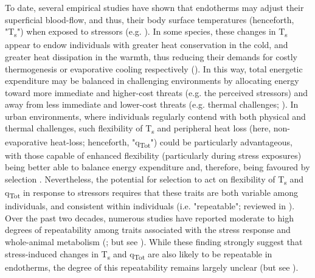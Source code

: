 \documentclass[12pt]{article}
\begin{document}
\noindent To date, several empirical studies have shown that endotherms may adjust their superficial blood-flow, and thus, their body surface temperatures (henceforth, "T\textsubscript{s}") when exposed to stressors (e.g. \citealt{blair_1959,yokoi_1966,nord_2019b,winder_2020}). In some species, these changes in T\textsubscript{s} appear to endow individuals with greater heat conservation in the cold, and greater heat dissipation in the warmth, thus reducing their demands for costly thermogenesis or evaporative cooling respectively (\citealt{jerem_2018,robertson_2020a,winder_2020}). In this way, total energetic expenditure may be balanced in challenging environments by allocating energy toward more immediate and higher-cost threats (e.g. the perceived stressors) and away from less immediate and lower-cost threats (e.g. thermal challenges; \citealt{jerem_2018,robertson_2020a}). In urban environments, where individuals regularly contend with both physical and thermal challenges, such flexibility of T\textsubscript{s} and peripheral heat loss (here, non-evaporative heat-loss; henceforth, "q\textsubscript{Tot}") could be particularly advantageous, with those capable of enhanced flexibility (particularly during stress exposures) being better able to balance energy expenditure and, therefore, being favoured by selection \citep{parsons_2005}. Nevertheless, the potential for selection to act on flexibility of T\textsubscript{s} and q\textsubscript{Tot} in response to stressors requires that these traits are both variable among individuals, and consistent within individuals (i.e. "repeatable"; reviewed in \citealt{boake_1989,wolak_2012}). Over the past two decades, numerous studies have reported moderate to high degrees of repeatability among traits associated with the stress response and whole-animal metabolism (\citealt{nespolo_2007,rensel_2011,muller_2018,boratynski_2019}; but see \citealt{ouyang_2011}). While these finding strongly suggest that stress-induced changes in T\textsubscript{s} and q\textsubscript{Tot} are also likely to be repeatable in endotherms, the degree of this repeatability remains largely unclear (but see \citealt{careau_2012}). \vspace{1cm}
\end{document}
